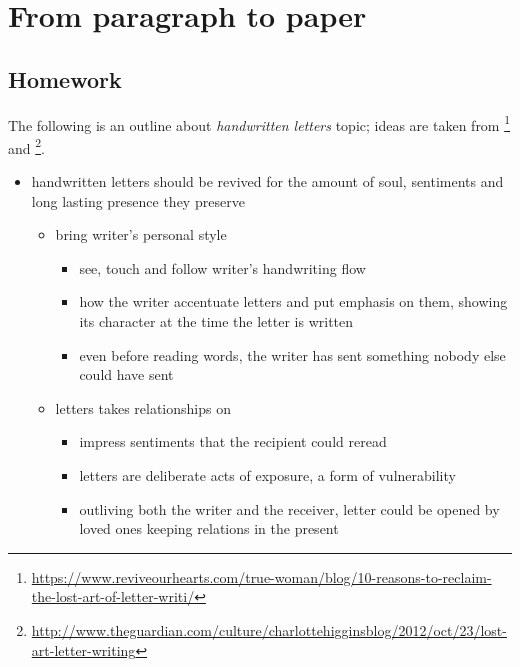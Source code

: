 

\chapter{From paragraph to paper}

\section{Homework}

The following is an outline about \emph{handwritten letters} topic; ideas are taken from 
\footnote{\url{https://www.reviveourhearts.com/true-woman/blog/10-reasons-to-reclaim-the-lost-art-of-letter-writi/}}
and \footnote{\url{http://www.theguardian.com/culture/charlottehigginsblog/2012/oct/23/lost-art-letter-writing}}.

\begin{itemize}
    \item handwritten letters should be revived for the amount of soul, sentiments and
            long lasting presence they preserve

    \begin{itemize}
        
        \item bring writer's personal style

            \begin{itemize}
                \item see, touch and follow writer's handwriting flow
                \item how the writer accentuate letters and put emphasis on them, showing its 
                        character at the time the letter is written
                \item even before reading words, the writer has sent something nobody else 
                        could have sent
            \end{itemize}

        \item letters takes relationships on

            \begin{itemize}
                \item impress sentiments that the recipient could reread
                \item letters are deliberate acts of exposure, a form of vulnerability
                \item outliving both the writer and the receiver, letter could
                        be opened by loved ones keeping relations in the present
            \end{itemize}


\end{itemize}
\end{itemize}
